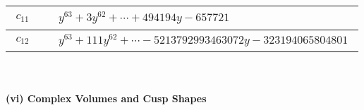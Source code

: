 \documentclass[1p]{elsarticle_modified}
\theoremstyle{definition}
\begin{document}
\begin{tabular}{m{50pt}|m{274pt}}
\hline $$\begin{aligned}c_{11}\end{aligned}$$&$\begin{aligned}
&y^{63}+3 y^{62}+\cdots+494194 y-657721
\end{aligned}$\\
\hline $$\begin{aligned}c_{12}\end{aligned}$$&$\begin{aligned}
&y^{63}+111 y^{62}+\cdots-5213792993463072 y-323194065804801
\end{aligned}$\\
\hline
\end{tabular}\\~\\
\newpage\flushleft \textbf{(vi) Complex Volumes and Cusp Shapes}
\end{document}
